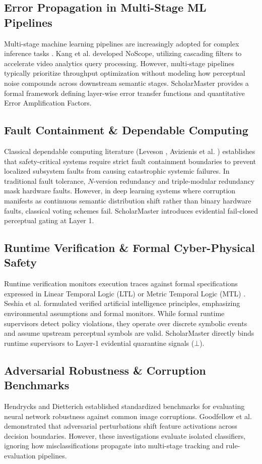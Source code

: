 \documentclass[conference]{IEEEtran}
\begin{document}
\subsection{Error Propagation in Multi-Stage ML Pipelines}
Multi-stage machine learning pipelines are increasingly adopted for complex inference tasks \cite{kang2017noscope, kumar2026scholar22}. Kang et al. \cite{kang2017noscope} developed NoScope, utilizing cascading filters to accelerate video analytics query processing. However, multi-stage pipelines typically prioritize throughput optimization without modeling how perceptual noise compounds across downstream semantic stages. ScholarMaster provides a formal framework defining layer-wise error transfer functions and quantitative Error Amplification Factors.

\subsection{Fault Containment \& Dependable Computing}
Classical dependable computing literature (Leveson \cite{leveson1995safeware}, Avizienis et al. \cite{avizienis2004basic}) establishes that safety-critical systems require strict fault containment boundaries to prevent localized subsystem faults from causing catastrophic systemic failures. In traditional fault tolerance, $N$-version redundancy and triple-modular redundancy mask hardware faults. However, in deep learning systems where corruption manifests as continuous semantic distribution shift rather than binary hardware faults, classical voting schemes fail. ScholarMaster introduces evidential fail-closed perceptual gating at Layer 1.

\subsection{Runtime Verification \& Formal Cyber-Physical Safety}
Runtime verification monitors execution traces against formal specifications expressed in Linear Temporal Logic (LTL) or Metric Temporal Logic (MTL) \cite{pnueli1977temporal, seshia2018toward}. Seshia et al. \cite{seshia2018toward} formulated verified artificial intelligence principles, emphasizing environmental assumptions and formal monitors. While formal runtime supervisors detect policy violations, they operate over discrete symbolic events and assume upstream perceptual symbols are valid. ScholarMaster directly binds runtime supervisors to Layer-1 evidential quarantine signals ($\bot$).

\subsection{Adversarial Robustness \& Corruption Benchmarks}
Hendrycks and Dietterich \cite{hendrycks2019benchmarking} established standardized benchmarks for evaluating neural network robustness against common image corruptions. Goodfellow et al. \cite{goodfellow2014explaining} demonstrated that adversarial perturbations shift feature activations across decision boundaries. However, these investigations evaluate isolated classifiers, ignoring how misclassifications propagate into multi-stage tracking and rule-evaluation pipelines.
\end{document}
